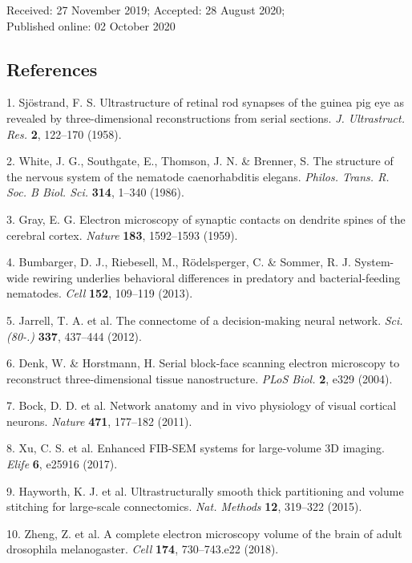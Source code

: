 \documentclass{article}
\begin{document}
\noindent Received: 27 November 2019; Accepted: 28 August 2020;\\
Published online: 02 October 2020

\subsection*{References}

\begin{hangpars}\small
1. Sjöstrand, F. S. Ultrastructure of retinal rod synapses of the guinea pig eye as revealed by three-dimensional reconstructions from serial sections. \emph{J. Ultrastruct. Res.} \textbf{2}, 122–170 (1958).

2. White, J. G., Southgate, E., Thomson, J. N. \& Brenner, S. The structure of the nervous system of the nematode caenorhabditis elegans. \emph{Philos. Trans. R. Soc. B Biol. Sci.} \textbf{314}, 1–340 (1986).

3. Gray, E. G. Electron microscopy of synaptic contacts on dendrite spines of the cerebral cortex. \emph{Nature} \textbf{183}, 1592–1593 (1959).

4. Bumbarger, D. J., Riebesell, M., Rödelsperger, C. \& Sommer, R. J. System-wide rewiring underlies behavioral differences in predatory and bacterial-feeding nematodes. \emph{Cell} \textbf{152}, 109–119 (2013).

5. Jarrell, T. A. et al. The connectome of a decision-making neural network. \emph{Sci. (80-.)} \textbf{337}, 437–444 (2012).

6. Denk, W. \& Horstmann, H. Serial block-face scanning electron microscopy to reconstruct three-dimensional tissue nanostructure. \emph{PLoS Biol.} \textbf{2}, e329 (2004).

7. Bock, D. D. et al. Network anatomy and in vivo physiology of visual cortical neurons. \emph{Nature} \textbf{471}, 177–182 (2011).

8. Xu, C. S. et al. Enhanced FIB-SEM systems for large-volume 3D imaging. \emph{Elife} \textbf{6}, e25916 (2017).

9. Hayworth, K. J. et al. Ultrastructurally smooth thick partitioning and volume stitching for large-scale connectomics. \emph{Nat. Methods} \textbf{12}, 319–322 (2015).

10. Zheng, Z. et al. A complete electron microscopy volume of the brain of adult drosophila melanogaster. \emph{Cell} \textbf{174}, 730–743.e22 (2018).


\end{hangpars}
\end{document}
